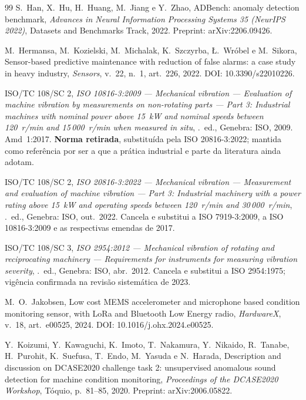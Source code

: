 \documentclass[11pt,a4paper]{article}
\begin{document}
\begin{thebibliography}{99}
S.~Han, X.~Hu, H.~Huang, M.~Jiang e Y.~Zhao,
\newblock ADBench: anomaly detection benchmark,
\newblock \emph{Advances in Neural Information Processing Systems 35 (NeurIPS 2022)}, Datasets and Benchmarks Track, 2022.
\newblock Preprint: arXiv:2206.09426.

M.~Hermansa, M.~Kozielski, M.~Michalak, K.~Szczyrba, Ł.~Wróbel e M.~Sikora,
\newblock Sensor-based predictive maintenance with reduction of false alarms: a case study in heavy industry,
\newblock \emph{Sensors}, v.~22, n.~1, art.~226, 2022.
\newblock DOI: 10.3390/s22010226.

ISO/TC 108/SC 2,
\newblock \emph{ISO 10816-3:2009 --- Mechanical vibration --- Evaluation of machine vibration by measurements on non-rotating parts --- Part 3: Industrial machines with nominal power above 15~kW and nominal speeds between 120~r/min and 15\,000~r/min when measured in situ},
.~ed., Genebra: ISO, 2009. Amd~1:2017.
\newblock \textbf{Norma retirada}, substituída pela ISO 20816-3:2022; mantida como referência por ser a que a prática industrial e parte da literatura ainda adotam.

ISO/TC 108/SC 2,
\newblock \emph{ISO 20816-3:2022 --- Mechanical vibration --- Measurement and evaluation of machine vibration --- Part 3: Industrial machinery with a power rating above 15~kW and operating speeds between 120~r/min and 30\,000~r/min},
.~ed., Genebra: ISO, out.\ 2022.
\newblock Cancela e substitui a ISO 7919-3:2009, a ISO 10816-3:2009 e as respectivas emendas de 2017.

ISO/TC 108/SC 3,
\newblock \emph{ISO 2954:2012 --- Mechanical vibration of rotating and reciprocating machinery --- Requirements for instruments for measuring vibration severity},
.~ed., Genebra: ISO, abr.\ 2012.
\newblock Cancela e substitui a ISO 2954:1975; vigência confirmada na revisão sistemática de 2023.

M.~O.~Jakobsen,
\newblock Low cost MEMS accelerometer and microphone based condition monitoring sensor, with LoRa and Bluetooth Low Energy radio,
\newblock \emph{HardwareX}, v.~18, art.~e00525, 2024.
\newblock DOI: 10.1016/j.ohx.2024.e00525.

Y.~Koizumi, Y.~Kawaguchi, K.~Imoto, T.~Nakamura, Y.~Nikaido, R.~Tanabe, H.~Purohit, K.~Suefusa, T.~Endo, M.~Yasuda e N.~Harada,
\newblock Description and discussion on DCASE2020 challenge task 2: unsupervised anomalous sound detection for machine condition monitoring,
\newblock \emph{Proceedings of the DCASE2020 Workshop}, Tóquio, p.~81--85, 2020.
\newblock Preprint: arXiv:2006.05822.


\end{thebibliography}
\end{document}
